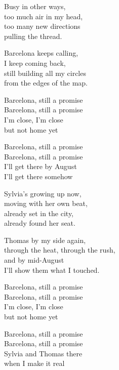 \begin{lyrics}
Busy in other ways,\\
too much air in my head,\\
too many new directions\\
pulling the thread.

Barcelona keeps calling,\\
I keep coming back,\\
still building all my circles\\
from the edges of the map.

Barcelona, still a promise\\
Barcelona, still a promise\\
I’m close, I’m close\\
but not home yet

Barcelona, still a promise\\
Barcelona, still a promise\\
I’ll get there by August\\
I’ll get there somehow

Sylvia’s growing up now,\\
moving with her own beat,\\
already set in the city,\\
already found her seat.

Thomas by my side again,\\
through the heat, through the rush,\\
and by mid-August\\
I’ll show them what I touched.

Barcelona, still a promise\\
Barcelona, still a promise\\
I’m close, I’m close\\
but not home yet

Barcelona, still a promise\\
Barcelona, still a promise\\
Sylvia and Thomas there\\
when I make it real
\end{lyrics}

